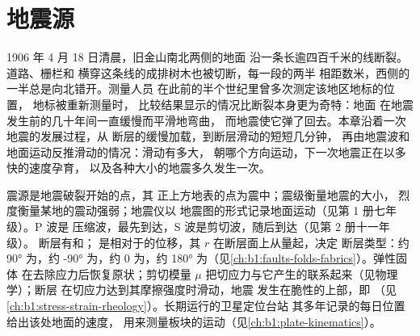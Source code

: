 \chapter{地震源}\label{ch:b1:earthquake-source}

1906 年 4 月 18 日清晨，旧金山南北两侧的地面
沿一条长逾四百千米的线断裂。道路、栅栏和
横穿这条线的成排树木也被切断，每一段的两半
相距数米，西侧的一半总是向北错开。测量人员
在此前的半个世纪里曾多次测定该地区地标的位置，
地标被重新测量时，
比较结果显示的情况比断裂本身更为奇特：地面
在地震发生前的几十年间一直缓慢而平滑地弯曲，
而地震使它弹了回去。本章沿着一次地震的发展过程，从
断层的缓慢加载，到断层滑动的短短几分钟，
再由地震波和地面运动反推滑动的情况：滑动有多大，
朝哪个方向运动，下一次地震正在以多快的速度孕育，
以及各种大小的地震多久发生一次。

\begin{recall}
震源是地震破裂开始的点，其
正上方地表的点为震中；震级衡量地震的大小，
烈度衡量某地的震动强弱；地震仪以
地震图的形式记录地面运动（见第 1 册七年级）。P 波是
压缩波，最先到达，S 波是剪切波，随后到达（见第 2 册十一年级）。
断层有和；
是相对于的位移，其
$r$ 在断层面上从量起，决定
断层类型：约 \ang{90} 为，约 \ang{-90} 为，约 0 为，约
\ang{180} 为（见\cref{ch:b1:faults-folds-fabrics}）。弹性固体
在去除应力后恢复原状；剪切模量 $\mu$
把切应力与它产生的联系起来（见物理学）；断层
在切应力达到其摩擦强度时滑动，地震
发生在脆性的上部，即
（见\cref{ch:b1:stress-strain-rheology}）。长期运行的卫星定位台站
其多年记录的每日位置给出该处地面的速度，
用来测量板块的运动（见\cref{ch:b1:plate-kinematics}）。
\end{recall}

